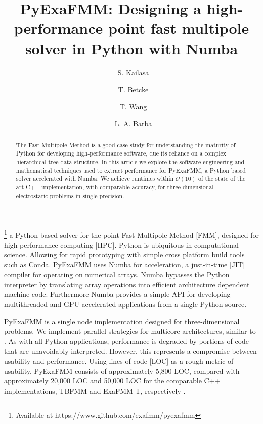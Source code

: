 \documentclass{IEEEcsmag}
\begin{document}

\title{PyExaFMM: Designing a high-performance point fast multipole solver in Python with Numba}

\author{\ S. Kailasa}

\author{\ T. Betcke}

\author{\ T. Wang}

\author{\ L. A. Barba}


\begin{abstract}
The Fast Multipole Method is a good case study for understanding the maturity of Python for developing high-performance software, due its reliance on a complex hierarchical tree data structure. In this article we explore the software engineering and mathematical techniques used to extract performance for PyExaFMM, a Python based solver accelerated with Numba. We achieve runtimes within $\mathcal{O}(10)$ of the state of the art C++ implementation, with comparable accuracy, for three dimensional electrostatic problems in single precision.

\end{abstract}

\maketitle
{}\footnote{Available at https://www.github.com/exafmm/pyexafmm} a Python-based solver for the point Fast Multipole Method [FMM], designed for high-performance computing [HPC]. Python is ubiquitous in computational science. Allowing for rapid prototyping with simple cross platform build tools such as Conda. PyExaFMM uses Numba for acceleration, a just-in-time [JIT] compiler for operating on numerical arrays. Numba bypasses the Python interpreter by translating array operations into efficient architecture dependent machine code. Furthermore Numba provides a simple API for developing multithreaded and GPU accelerated applications from a single Python source.

PyExaFMM is a single node implementation designed for three-dimensional problems. We implement parallel strategies for multicore architectures, similar to \cite{Bramas2020, Wang2021}. As with all Python applications, performance is degraded by portions of code that are unavoidably interpreted. However, this represents a compromise between usability and performance. Using lines-of-code [LOC] as a rough metric of usability, PyExaFMM consists of approximately 5,800 LOC, compared with approximately 20,000 LOC and 50,000 LOC for the comparable C++ implementations, TBFMM and ExaFMM-T, respectively \cite{Bramas2020, Wang2021}.
\end{document}
